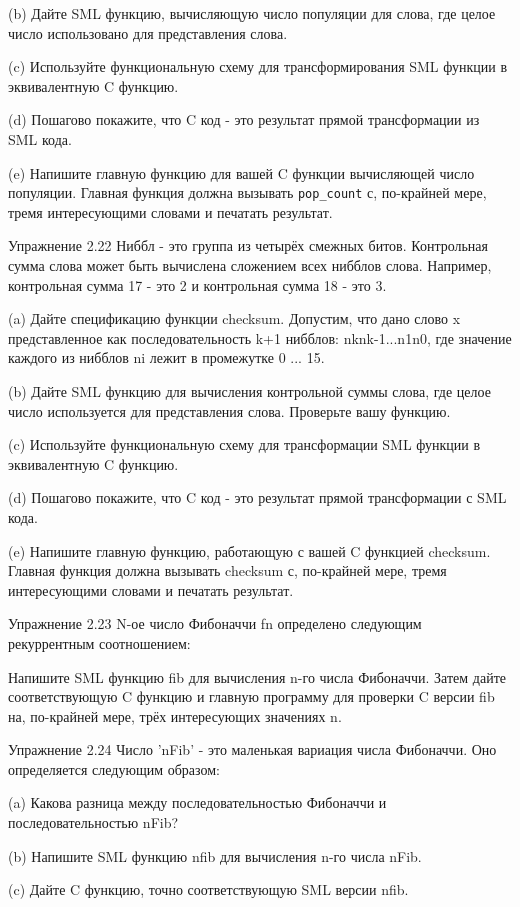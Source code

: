 (b) Дайте SML функцию, вычисляющую число популяции для слова, где целое число использовано для представления слова.

(c) Используйте функциональную схему для трансформирования SML функции в эквивалентную C функцию.

(d) Пошагово покажите, что C код - это результат прямой трансформации из SML кода.

(e) Напишите главную функцию для вашей C функции вычисляющей число популяции. Главная функция должна вызывать \lstinline|pop_count| с, по-крайней мере, тремя интересующими словами и печатать результат.

Упражнение 2.22 Ниббл - это группа из четырёх смежных битов. Контрольная сумма слова может быть вычислена сложением всех нибблов слова. Например, контрольная сумма 17 - это 2 и контрольная сумма 18 - это 3.

(a) Дайте спецификацию функции checksum. Допустим, что дано слово x представленное как последовательность k+1 нибблов: nknk-1...n1n0, где значение каждого из нибблов ni лежит в промежутке 0 ... 15.

(b) Дайте SML функцию для вычисления контрольной суммы слова, где целое число используется для представления слова. Проверьте вашу функцию.

(c) Используйте функциональную схему для трансформации SML функции в эквивалентную C функцию.

(d) Пошагово покажите, что C код - это результат прямой трансформации с SML кода.

(e) Напишите главную функцию, работающую с вашей C функцией checksum. Главная функция должна вызывать checksum с, по-крайней мере, тремя интересующими словами и печатать результат.

Упражнение 2.23 N-ое число Фибоначчи fn определено следующим рекуррентным соотношением:

Напишите SML функцию fib для вычисления n-го числа Фибоначчи. Затем дайте соответствующую C функцию и главную программу для проверки C версии fib на, по-крайней мере, трёх интересующих значениях n.

Упражнение 2.24 Число 'nFib' - это маленькая вариация числа Фибоначчи. Оно определяется следующим образом:

(a) Какова разница между последовательностью Фибоначчи и последовательностью nFib?

(b) Напишите SML функцию nfib для вычисления n-го числа nFib.

(c) Дайте C функцию, точно соответствующую SML версии nfib.

